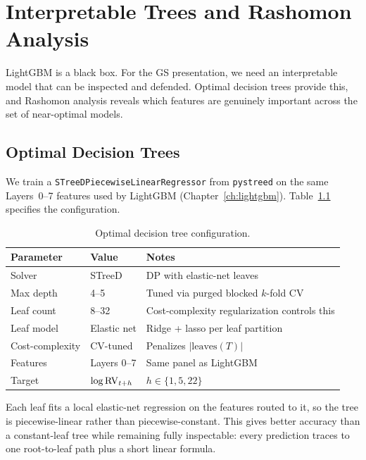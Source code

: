 \chapter{Interpretable Trees and Rashomon Analysis}
\label{ch:rashomon}

LightGBM is a black box.
For the GS presentation, we need an interpretable model that can be inspected and defended.
Optimal decision trees provide this, and Rashomon analysis reveals which features are genuinely important across the set of near-optimal models.

\section{Optimal Decision Trees}
\label{sec:optimal-trees}

We train a \texttt{STreeDPiecewiseLinearRegressor} from \texttt{pystreed} on the same Layers~0--7 features used by LightGBM (Chapter~\ref{ch:lightgbm}).
Table~\ref{tab:odt-config} specifies the configuration.

\begin{table}[htbp]
\centering
\caption{Optimal decision tree configuration.}
\label{tab:odt-config}
\small
\begin{tabular}{@{}llp{5.5cm}@{}}
\toprule
\textbf{Parameter} & \textbf{Value} & \textbf{Notes} \\
\midrule
Solver               & STreeD          & DP with elastic-net leaves \\
Max depth            & 4--5            & Tuned via purged blocked $k$-fold CV \\
Leaf count           & 8--32           & Cost-complexity regularization controls this \\
Leaf model           & Elastic net     & Ridge + lasso per leaf partition \\
Cost-complexity      & CV-tuned        & Penalizes $|\text{leaves}(T)|$ \\
Features             & Layers 0--7     & Same panel as LightGBM \\
Target               & $\log \operatorname{RV}_{t+h}$ & $h \in \{1, 5, 22\}$ \\
\bottomrule
\end{tabular}
\end{table}

Each leaf fits a local elastic-net regression on the features routed to it, so the tree is piecewise-linear rather than piecewise-constant.
This gives better accuracy than a constant-leaf tree while remaining fully inspectable: every prediction traces to one root-to-leaf path plus a short linear formula.

